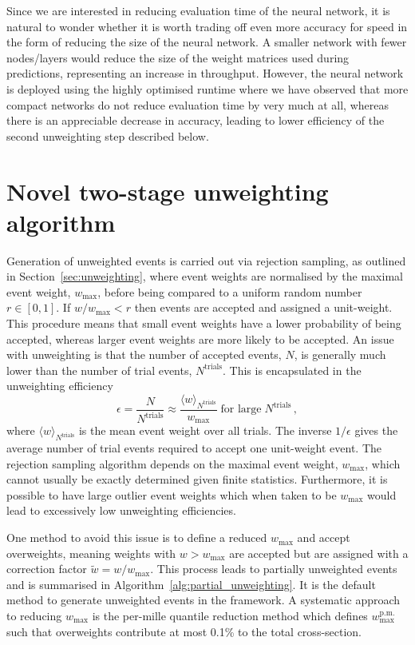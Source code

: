 \documentclass[main.tex]{subfiles}
\begin{document}
Since we are interested in reducing evaluation time of the neural
network, it is natural to wonder whether it is worth trading
off even more accuracy for speed in the form of reducing the size of the
neural network. A smaller network with fewer nodes/layers would reduce
the size of the weight matrices used during predictions, representing an
increase in throughput.
However, the neural network is deployed using the highly optimised
{\ONNX} runtime where we have observed that more compact networks
do not reduce evaluation time by very much at all, whereas there
is an appreciable decrease in accuracy, leading to lower efficiency
of the second unweighting step described below.

\section{Novel two-stage unweighting algorithm}\label{sec:twostep}
Generation of unweighted events is carried out via rejection sampling,
as outlined in Section~\ref{sec:unweighting}, where event weights
are normalised by the maximal event weight, $w_{\mathrm{max}}$,
before being compared to a uniform random number $r \in [0,1]$. If
$w / w_{\mathrm{max}} < r$ then events are accepted and assigned
a unit-weight. This procedure means that small event weights
have a lower probability of being accepted, whereas larger event weights
are more likely to be accepted. An issue with unweighting is that
the number of accepted events, $N$, is generally much lower than the
number of trial events, $N^{\mathrm{trials}}$. This is encapsulated in
the unweighting efficiency
\begin{equation}
    \epsilon = \dfrac{N}{N^{\mathrm{trials}}} \approx \dfrac{\langle w \rangle_{N^{\mathrm{trials}}}}{w_{\mathrm{max}}} \; \text{for large} \; N^{\mathrm{trials}} \, ,
    \label{eqn:pp_unweighting_efficiency}
\end{equation}
where $\langle w \rangle_{N^{\mathrm{trials}}}$ is the mean event weight
over all trials. The inverse $1 / \epsilon$ gives the average number of
trial events required to accept one unit-weight event. The rejection
sampling algorithm depends
on the maximal event weight, $w_{\mathrm{max}}$, which cannot usually be
exactly determined given finite statistics. Furthermore, it is possible to
have large outlier event weights which when taken to be $w_{\mathrm{max}}$ would
lead to excessively low unweighting efficiencies.

One method to avoid this issue is to define a reduced $w_{\mathrm{max}}$
and accept overweights, meaning weights with $w > w_{\mathrm{max}}$
are accepted but are assigned with a correction factor
$\tilde{w} = w / w_{\mathrm{max}}$.
This process leads to partially
unweighted events and is summarised in Algorithm~\ref{alg:partial_unweighting}.
It is the default method to generate unweighted events in the {\Sherpa}
framework.
A systematic approach to reducing $w_{\mathrm{max}}$
is the per-mille quantile reduction method which defines $w_{\mathrm{max}}^{\mathrm{p.m.}}$
such that overweights contribute at most 0.1\% to the total cross-section.
\end{document}
